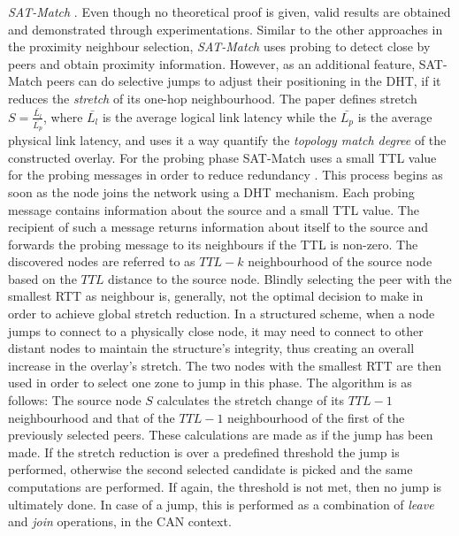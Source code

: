 \emph{SAT-Match} \cite{RGJZ2004}. Even though no theoretical proof is
given, valid results are obtained and demonstrated through experimentations.
Similar to the other approaches in the proximity neighbour selection,
\textit{SAT-Match} uses probing to detect close by peers and obtain proximity
information. However, as an additional feature, SAT-Match peers can do
selective jumps to adjust their positioning in the DHT, if it reduces the
\emph{stretch} of its one-hop neighbourhood. The paper defines stretch
$S = \frac{\bar{L_l}}{\bar{L_p}}$, where $\bar{L_l}$ is the average
logical link latency while the $\bar{L_p}$ is the average physical
link latency, and uses it a way quantify the \emph{topology
match degree} of the constructed overlay. For the probing phase SAT-Match uses a
small TTL value for the probing messages in order to reduce
redundancy \cite{jiang_lightflood_2008}. This process begins as soon as the node
joins the network using a DHT mechanism. Each probing message contains
information about the source and a small TTL value. The recipient of such a
message returns information about itself to the source and forwards the probing
message to its neighbours if the TTL is non-zero. The discovered nodes are
referred to as $TTL-k$ neighbourhood of the source node based on the $TTL$
distance to the source node. Blindly selecting the peer with the smallest RTT
as neighbour is, generally, not the optimal decision to make in order to achieve
global stretch reduction. In a structured scheme, when a node jumps to connect
to a physically close node, it may need to connect to other distant nodes to
maintain the structure's integrity, thus creating an overall increase in the
overlay's stretch. The two nodes with the smallest RTT are then used in order to
select one zone to jump in this phase. The algorithm is as follows: The source
node $S$ calculates the stretch change of its $TTL-1$ neighbourhood and that of
the $TTL-1$ neighbourhood of the first of the previously selected peers. These
calculations are made as if the jump has been made. If the stretch reduction is
over a predefined threshold the jump is performed, otherwise the second selected
candidate is picked and the same computations are performed. If again, the
threshold is not met, then no jump is ultimately done. In case of a jump, this
is performed as a combination of \emph{leave} and \emph{join} operations, in the
CAN context.

